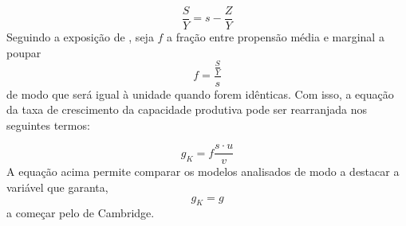 \begin{equation}
\label{Poupanca_Super}
    \frac{S}{Y} = s - \frac{Z}{Y}
\end{equation}
Seguindo a exposição de \textcite{serrano_sraffian_1995}, seja $f$ a fração entre propensão média e marginal a poupar
$$
f = \frac{\frac{S}{Y}}{s}
$$
de modo que será igual à unidade quando forem idênticas. 
Com isso, a equação da taxa de crescimento da capacidade produtiva pode ser rearranjada nos seguintes termos:


\begin{equation}
 \label{EqGeral}   
g_K =  f\frac{s\cdot u}{v}
\end{equation}
A equação acima permite comparar os modelos analisados de modo a destacar a variável que garanta, 
$$
g_K = g
$$
a começar pelo de Cambridge.
